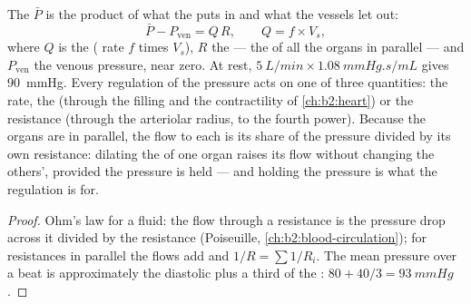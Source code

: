 \begin{theorem}\label{thm:b2:blood-pressure:equation}
The  $\bar P$ is the product of what the 
puts in and what the vessels let out:
\[
\bar P - P_{\text{ven}} = Q\,R, \qquad Q = f\times V_s,
\]
where $Q$ is the  ( rate $f$ times 
$V_s$), $R$ the  --- the  of all
the organs in parallel --- and $P_{\text{ven}}$ the venous pressure,
near zero. At rest, $\qty{5}{L/min}\times\qty{1.08}{mmHg.s/mL}$ gives
\qty{90}{mmHg}. Every regulation of the pressure acts on one of three
quantities: the rate, the  (through the filling and the
contractility of \cref{ch:b2:heart}) or the resistance (through the
arteriolar radius, to the fourth power). Because the organs are in
parallel, the flow to each is its share of the pressure divided by
its own resistance: dilating the  of one organ raises its
flow without changing the others', provided the pressure is held ---
and holding the pressure is what the regulation is for.
\end{theorem}
\begin{proof}
Ohm's law for a fluid: the flow through a resistance is the pressure
drop across it divided by the resistance (Poiseuille,
\cref{ch:b2:blood-circulation}); for resistances in parallel the
flows add and $1/R = \sum 1/R_i$. The mean pressure over a beat is
approximately the diastolic plus a third of the :
$80 + 40/3 = \qty{93}{mmHg}$.
\end{proof}


